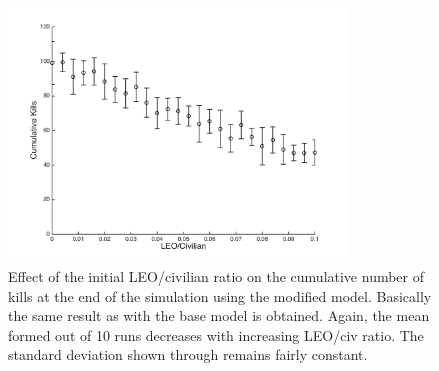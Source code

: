 \documentclass[11pt]{article}
\begin{document}
\begin{figure}[!htbp]
	\centering
		\includegraphics[width=0.80\textwidth]{../../code/modified_model/cum_kills_vs_LEO_civ.png}
	\caption{Effect of the initial LEO/civilian ratio on the cumulative number of kills at the end of the simulation using the modified model. Basically the same result as with the base model is obtained. Again, the mean formed out of 10 runs decreases with increasing LEO/civ ratio. The standard deviation shown through remains fairly constant.}
	\label{fig:LEO_civ_modified}
\end{figure}
\end{document}

